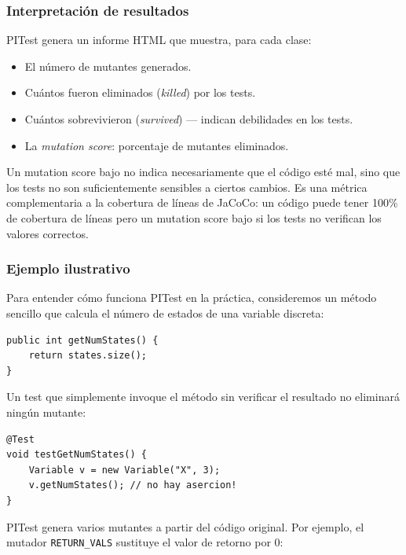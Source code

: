\documentclass[12pt,a4paper]{article}
\begin{document}
\subsubsection{Interpretación de resultados}

PITest genera un informe HTML que muestra, para cada clase:

\begin{itemize}
  \item El número de mutantes generados.
  \item Cuántos fueron eliminados (\emph{killed}) por los tests.
  \item Cuántos sobrevivieron (\emph{survived}) --- indican debilidades en
    los tests.
  \item La \emph{mutation score}: porcentaje de mutantes eliminados.
\end{itemize}

Un mutation score bajo no indica necesariamente que el código esté mal, sino
que los tests no son suficientemente sensibles a ciertos cambios. Es una
métrica complementaria a la cobertura de líneas de JaCoCo: un código puede
tener 100\% de cobertura de líneas pero un mutation score bajo si los tests
no verifican los valores correctos.

\subsubsection{Ejemplo ilustrativo}

Para entender cómo funciona PITest en la práctica, consideremos un método
sencillo que calcula el número de estados de una variable discreta:

\begin{lstlisting}[caption={Método original que será mutado por PITest},
  label={lst:pitest-original}]
public int getNumStates() {
    return states.size();
}
\end{lstlisting}

Un test que simplemente invoque el método sin verificar el resultado no
eliminará ningún mutante:

\begin{lstlisting}[caption={Test débil --- no elimina mutantes},
  label={lst:pitest-weak}]
@Test
void testGetNumStates() {
    Variable v = new Variable("X", 3);
    v.getNumStates(); // no hay asercion!
}
\end{lstlisting}

PITest genera varios mutantes a partir del código original. Por ejemplo,
el mutador \texttt{RETURN\_VALS} sustituye el valor de retorno por 0:
\end{document}
